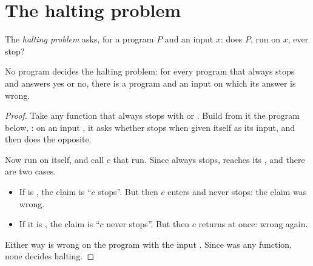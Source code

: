 \section{The halting problem}\label{sec:g12:halting-problem:halting}

The \emph{halting problem} asks, for a program $P$ and an input $x$: does $P$, run on $x$, ever stop?

\begin{theorem}\label{thm:g12:halting-problem:halting}
No program decides the halting problem: for every program  that
always stops and answers yes or no, there is a program and an input on which its answer is wrong.
\end{theorem}

\begin{proof}
Take any function  that always stops with  or . Build from it the program below,
: on an input , it asks  whether  stops when given itself as
its input, and then does the opposite.

\label{lst:g12:halting-problem:contrarian}

Now run  on itself, and call $c$ that run. Since  always stops,  reaches
its , and there are two cases.
\begin{itemize}
  \item If  is , the claim is ``$c$ stops''. But then $c$ enters
     and never stops: the claim was wrong.
  \item If it is , the claim is ``$c$ never stops''. But then $c$ returns at once: wrong again.
\end{itemize}
Either way  is wrong on the program  with the input . Since
 was any function, none decides halting.
\end{proof}

